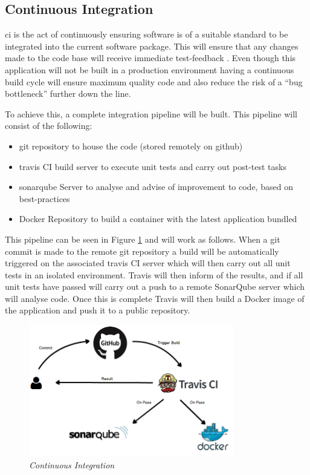 \subsection{Continuous Integration}
\label{subs:CI}
\gls{ci} is the act of continuously ensuring software is of a suitable standard to be integrated into the current software package. This will ensure that any changes made to the code base will receive immediate test-feedback \citep{Fowler2006}. Even though this application will not be built in a production environment having a continuous build cycle will ensure maximum quality code and also reduce the risk of a ``bug bottleneck'' further down the line.

To achieve this, a complete integration pipeline will be built. This pipeline will consist of the following:

\begin{itemize}
	\item \gls{git} repository to house the code (stored remotely on \gls{github})
	\item \gls{travis} CI build server to execute unit tests and carry out post-test tasks
	\item \gls{sonarqube} Server to analyse and advise of improvement to code, based on best-practices
	\item Docker Repository to build a container with the latest application bundled
\end{itemize}

This pipeline can be seen in Figure \ref{fig:CI} and will work as follows. When a git commit is made to the remote git repository a build will be automatically triggered on the associated \gls{travis} CI server which will then carry out all unit tests in an isolated environment. Travis will then inform of the results, and if all unit tests have passed will carry out a push to a remote SonarQube server which will analyse code. Once this is complete Travis will then build a Docker image of the application and push it to a public repository.

\begin{figure}[!ht]
\centering
\includegraphics*[width=0.8\textwidth]{images/CI}
\caption{\em Continuous Integration}
\label{fig:CI}
\end{figure}

